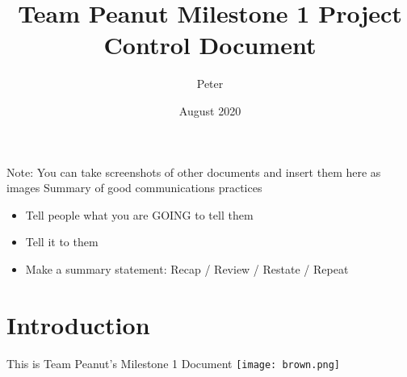 \documentclass{article}
\title{Team Peanut  Milestone 1 Project Control Document}
\author{Peter}
\date{August 2020}
\begin{document}
Note: You can take screenshots of other documents and insert
them here as images
\newline
Summary of good communications practices

\begin{itemize}
\item Tell people what you are GOING to tell them
\item Tell it to them
\item Make a summary statement: Recap / Review / Restate / Repeat
\end{itemize}
\newpage
\section  * {Introduction}
This is Team Peanut's Milestone 1 Document
\newline
\texttt{[image: brown.png]}


\end{document}
